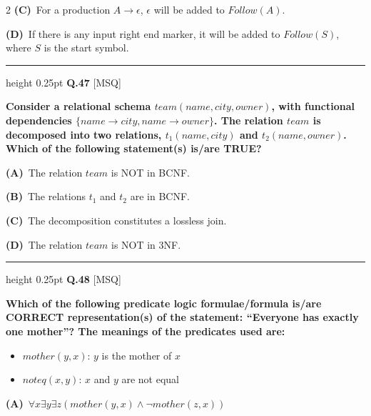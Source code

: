 \documentclass[a4paper,10pt,twoside]{article}
\begin{document}
\begin{multicols}{2}
\textbf{(C)}~For a production $A \to \epsilon$, $\epsilon$ will be added to $Follow(A)$.\par\vspace{2pt}\noindent
\textbf{(D)}~If there is any input right end marker, it will be added to $Follow(S)$, where $S$ is the start symbol.
\par\vspace{6pt}\hrule height 0.25pt\vspace{6pt}
\noindent\textbf{Q.47} \hfill {\footnotesize\textsf{[MSQ]}}
\par\vspace{2pt}
{\bfseries Consider a relational schema $team(name, city, owner)$, with functional dependencies $\{name \to city, name \to owner\}$. The relation $team$ is decomposed into two relations, $t_1(name, city)$ and $t_2(name, owner)$. Which of the following statement(s) is/are TRUE? \par}
\par\vspace{2pt}\noindent
\textbf{(A)}~The relation $team$ is NOT in BCNF.\par\vspace{2pt}\noindent
\textbf{(B)}~The relations $t_1$ and $t_2$ are in BCNF.\par\vspace{2pt}\noindent
\textbf{(C)}~The decomposition constitutes a lossless join.\par\vspace{2pt}\noindent
\textbf{(D)}~The relation $team$ is NOT in 3NF.
\par\vspace{6pt}\hrule height 0.25pt\vspace{6pt}
\noindent\textbf{Q.48} \hfill {\footnotesize\textsf{[MSQ]}}
\par\vspace{2pt}
{\bfseries Which of the following predicate logic formulae/formula is/are CORRECT representation(s) of the statement: ``Everyone has exactly one mother''?
The meanings of the predicates used are:
\begin{itemize}
\item $mother(y, x)$: $y$ is the mother of $x$
\item $noteq(x, y)$: $x$ and $y$ are not equal
\end{itemize} \par}
\par\vspace{2pt}\noindent
\textbf{(A)}~$\forall x \exists y \exists z (mother(y, x) \land \neg mother(z, x))$\par\vspace{2pt}\noindent

\end{multicols}
\end{document}
